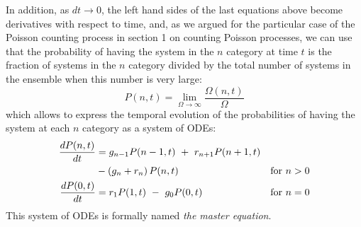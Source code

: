 \documentclass{article}
\begin{document}
In addition, as $dt \rightarrow 0$, the left hand sides of the last equations above become derivatives with respect to time, and, as we argued for the particular case of the Poisson counting process in section 1 on %
counting Poisson processes, we can use that the probability of having the system in the $n$ category at time $t$ is the fraction of systems in the $n$ category divided by the total number of systems in the ensemble when this number is very large:
\begin{equation}
P(n, t) = \lim_{\Omega \rightarrow \infty} \frac{\Omega(n,t)}{\Omega} 
\end{equation}
which allows to express the temporal evolution of the probabilities of having the system at each $n$ category as a system of ODEs:
\begin{align}
\frac{dP(n,t)}{dt} &=    g_{n-1} P(n-1,t) \,\, + \,\, r_{n+1} P(n+1,t) &                 \nonumber \\
                   &    - (g_n + r_n )\,P(n,t)              & \textup{for} \,\, n > 0    \nonumber \\
\frac{dP(0,t)}{dt} &=  r_1 P(1,t) \,\, - \,\, g_0 P(0,t)    & \textup{for} \,\, n=0 \label{me_1}
\end{align}
This system of ODEs is formally named {\em the master equation}. 
\end{document}
